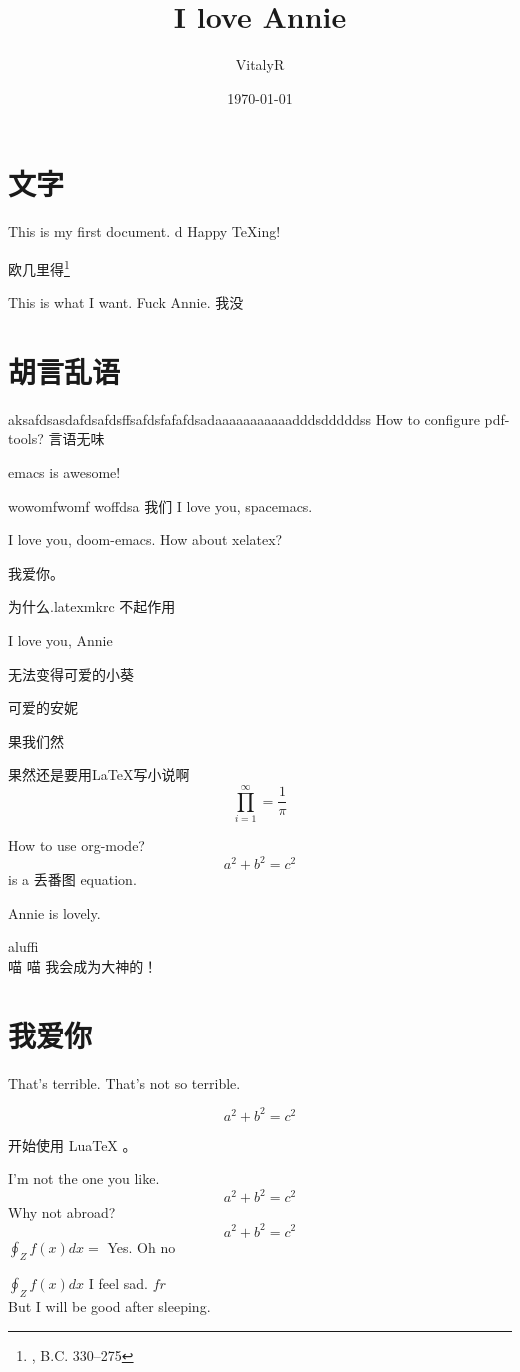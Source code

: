 \documentclass[UTF8]{ctexart}
\title{I love Annie}
\author{VitalyR}
\date{\today}
\begin{document}
\maketitle
\tableofcontents

\section{文字}
This is my first document.
d
Happy \TeX ing!

欧几里得\footnote{, B.C. 330--275}

This is what I want.
Fuck Annie.
我没

\section{胡言乱语}

aksafdsasdafdsafdsffsafdsfafafdsadaaaaaaaaaaadddsdddddss
How to configure pdf-tools?
言语无味

emacs is awesome!

wowomfwomf woffdsa
我们
I love you, spacemacs.

I love you, doom-emacs.
How about xelatex?

我爱你。

为什么.latexmkrc 不起作用

I love you, Annie

无法变得可爱的小葵

可爱的安妮

果我们然

果然还是要用\LaTeX 写小说啊
\begin{equation}
	\prod_{i=1}^{\infty}=\frac{1}{\pi}
\end{equation}

How to use org-mode?
\[a^{2}+b^{2}=c^{2}\] is a 丢番图 equation.

Annie is lovely.

aluffi \\
喵
喵
我会成为大神的！

\section{我爱你}

That's terrible.
That's not so terrible.



\begin{equation}
	\label{eq:2}
	a^{2}+b^{2}=c^{2}
\end{equation}

开始使用 LuaTeX 。

I'm not the one you like.
\[a^{2}+b^{2}=c^{2}\]
Why not abroad?
\[a^{2}+b^{2}=c^{2}\] \(\oint_{Z}f(x)dx = \) Yes.
Oh
no

\(\oint_{Z}f(x)dx\)
I feel sad.
\(fr\)
\[\]
But I will be good after sleeping.
\end{document}
